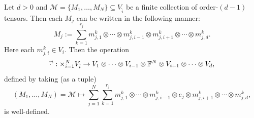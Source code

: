 \documentclass[../Lael_John_MasterThesis_Draft.tex]{subfiles}
\begin{document}
\begin{definition}\label{defn:creatingorderd}
    
    Let $d > 0$ and $\mathcal{M} = \{M_1, \ldots, M_N\} \subseteq V_{\hat{i}}$ be a finite collection of order-$(d-1)$ tensors. Then each $M_j$ can be written in the following manner: 
    \begin{equation}\label{eqn:lowerorderslice}
        M_j := \sum_{k=1}^{r_j} m^k_{j, 1} \otimes \cdots \otimes m^k_{j, i-1} \otimes m^k_{j, i+1} \otimes \cdots \otimes m^k_{j, d}.
    \end{equation} Here each $m_{j,i}^k \in V_i$.
    Then the operation $$\bar{\cdot}^i: \times_{i=1}^N V_{\hat{i}} \to V_1 \otimes \cdots \otimes V_{i-1} \otimes \mathbb{F}^N \otimes V_{i+1} \otimes \cdots \otimes V_d,$$ defined by taking (as a tuple) $$(M_1, \ldots, M_N) = \mathcal{M} \mapsto \sum_{j=1}^{N} \sum_{k=1}^{r_j}  m^k_{j, 1} \otimes \cdots \otimes m^k_{j, i-1}\otimes e_j \otimes m^k_{j, i+1} \otimes \cdots \otimes m^k_{j, d},$$ is well-defined.
\end{definition}
\end{document}
